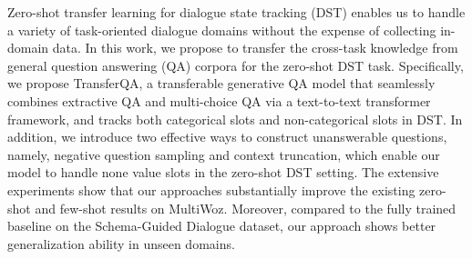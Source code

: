 Zero-shot transfer learning for dialogue state tracking (DST) enables us to handle a variety of task-oriented dialogue domains without the expense of collecting in-domain data. In this work, we propose to transfer the cross-task knowledge from general question answering (QA) corpora for the zero-shot DST task. Specifically, we propose TransferQA, a transferable generative QA model that seamlessly combines extractive QA and multi-choice QA via a text-to-text transformer framework, and tracks both categorical slots and non-categorical slots in DST. In addition, we introduce two effective ways to construct unanswerable questions, namely, negative question sampling and context truncation, which enable our model to handle none value slots in the zero-shot DST setting. The extensive experiments show that our approaches substantially improve the existing zero-shot and few-shot results on MultiWoz. Moreover, compared to the fully trained baseline on the Schema-Guided Dialogue dataset, our approach shows better generalization ability in unseen domains.
